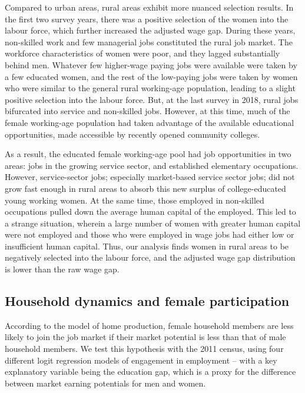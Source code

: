 Compared to urban areas, rural areas exhibit more nuanced selection results. In the first two survey years, there was a positive selection of the women into the labour force, which further increased the adjusted wage gap. During these years, non-skilled work and few managerial jobs constituted the rural job market. The workforce characteristics of women were poor, and they lagged substantially behind men. Whatever few higher-wage paying jobs were available were taken by a few educated women, and the rest of the low-paying jobs were taken by women who were similar to the general rural working-age population, leading to a slight positive selection into the labour force. But, at the last survey in 2018, rural jobs bifurcated into service and non-skilled jobs. However, at this time, much of the female working-age population had taken advantage of the available educational opportunities, made accessible by recently opened community colleges.\par 

As a result, the educated female working-age pool had job opportunities in two areas: jobs in the growing service sector, and established elementary occupations. However, service-sector jobs; especially market-based service sector jobs; did not grow fast enough in rural areas to absorb this new surplus of college-educated young working women. At the same time, those employed in non-skilled occupations pulled down the average human capital of the employed. This led to a strange situation, wherein a large number of women with greater human capital were not employed and those who were employed in wage jobs had either low or insufficient human capital. Thus, our analysis finds women in rural areas to be negatively selected into the labour force, and the adjusted wage gap distribution is lower than the raw wage gap.\par 

\subsection{Household dynamics and female participation}

According to the model of home production, female household members are less likely to join the job market if their market potential is less than that of male household members. We test this hypothesis with the 2011 census, using four different logit regression models of engagement in employment -- with a key explanatory variable being the education gap, which is a proxy for the difference between market earning potentials for men and women.\par 

